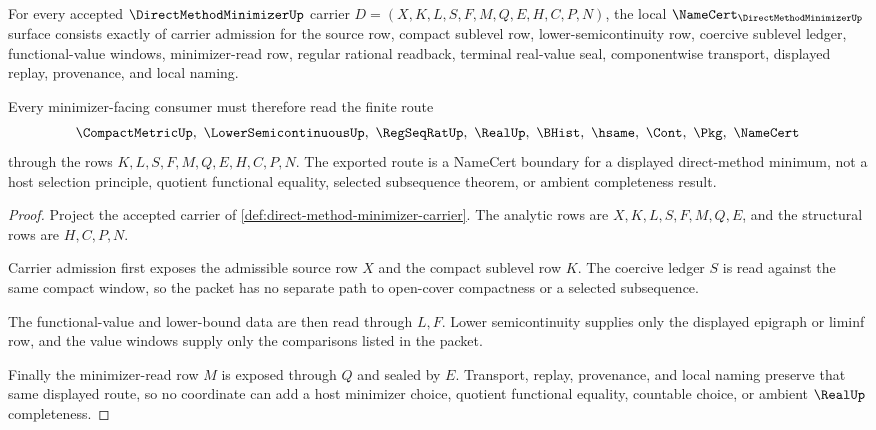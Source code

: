\begin{theorem}
\label{thm:direct-method-minimizer-namecert-obligations}
For every accepted $\DirectMethodMinimizerUp$ carrier $D=(X,K,L,S,F,M,Q,E,H,C,P,N)$, the local $\NameCert_{\DirectMethodMinimizerUp}$ surface consists exactly of carrier admission for the source row, compact sublevel row, lower-semicontinuity row, coercive sublevel ledger, functional-value windows, minimizer-read row, regular rational readback, terminal real-value seal, componentwise transport, displayed replay, provenance, and local naming.

Every minimizer-facing consumer must therefore read the finite route
$$
\CompactMetricUp,\ \LowerSemicontinuousUp,\ \RegSeqRatUp,\ \RealUp,\ \BHist,\ \hsame,\ \Cont,\ \Pkg,\ \NameCert
$$
through the rows $K,L,S,F,M,Q,E,H,C,P,N$. The exported route is a NameCert boundary for a displayed direct-method minimum, not a host selection principle, quotient functional equality, selected subsequence theorem, or ambient completeness result.
\end{theorem}
\begin{proof}
Project the accepted carrier of \autoref{def:direct-method-minimizer-carrier}. The analytic rows are $X,K,L,S,F,M,Q,E$, and the structural rows are $H,C,P,N$.

Carrier admission first exposes the admissible source row $X$ and the compact sublevel row $K$. The coercive ledger $S$ is read against the same compact window, so the packet has no separate path to open-cover compactness or a selected subsequence.

The functional-value and lower-bound data are then read through $L,F$. Lower semicontinuity supplies only the displayed epigraph or liminf row, and the value windows supply only the comparisons listed in the packet.

Finally the minimizer-read row $M$ is exposed through $Q$ and sealed by $E$. Transport, replay, provenance, and local naming preserve that same displayed route, so no coordinate can add a host minimizer choice, quotient functional equality, countable choice, or ambient $\RealUp$ completeness.
\end{proof}

